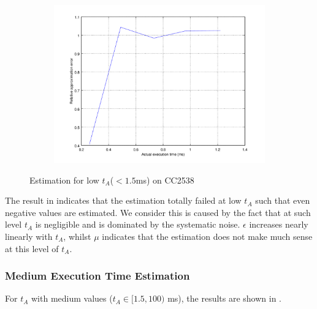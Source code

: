 \begin{figure}[ht!]
\begin{subfigure}{0.45\linewidth}
	\includegraphics[width=\linewidth]{fig/lowrtvtaerr.png}
	\end{subfigure}
	\caption{Estimation for low $t_A$($<1.5$ms) on CC2538}
	\label{Fig: Estimation for low tA}
\end{figure}

The result in  indicates that the estimation totally failed at low $t_A$ such that even negative values are estimated. We consider this is caused by the fact that at such level $t_A$ is negligible and is dominated by the systematic noise. $\epsilon$ increases nearly linearly with $t_A$, whilst $\mu$ indicates that the estimation does not make much sense at this level of $t_A$.

\subsubsection{Medium Execution Time Estimation}

For $t_A$ with medium values ($t_A \in[1.5, 100)$ ms), the results are shown in .

